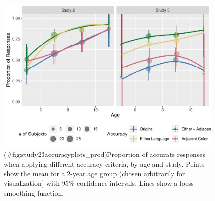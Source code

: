 \documentclass[
  english,
  ,man,floatsintext]{apa6}
\begin{document}
\begin{figure}
\centering
\includegraphics{amazon_color_files/figure-latex/study23accuracyplots_prod-1.pdf}
\caption{(\#fig:study23accuracyplots\_prod)Proportion of accurate responses when applying different accuracy criteria, by age and study. Points show the mean for a 2-year age group (chosen arbitrarily for visualization) with 95\% confidence intervals. Lines show a loess smoothing function.}
\end{figure}
\end{document}
